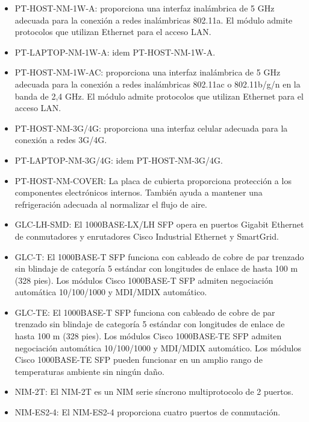 \documentclass{article}
\begin{document}
\begin{itemize}
    \item PT-HOST-NM-1W-A: proporciona una interfaz inalámbrica de 5 GHz adecuada para la conexión a redes inalámbricas 802.11a. El módulo admite protocolos que utilizan Ethernet para el acceso LAN.
    \item PT-LAPTOP-NM-1W-A: idem PT-HOST-NM-1W-A.
    
    \item PT-HOST-NM-1W-AC: proporciona una interfaz inalámbrica de 5 GHz adecuada para la conexión a redes inalámbricas 802.11ac o 802.11b/g/n en la banda de 2,4 GHz. El módulo admite protocolos que utilizan Ethernet para el acceso LAN.
    
    \item PT-HOST-NM-3G/4G: proporciona una interfaz celular adecuada para la conexión a redes 3G/4G.
    \item PT-LAPTOP-NM-3G/4G: idem PT-HOST-NM-3G/4G.

    \item PT-HOST-NM-COVER: La placa de cubierta proporciona protección a los componentes electrónicos internos. También ayuda a mantener una refrigeración adecuada al normalizar el flujo de aire.

    \item GLC-LH-SMD: El 1000BASE-LX/LH SFP opera en puertos Gigabit Ethernet de conmutadores y enrutadores Cisco Industrial Ethernet y SmartGrid.

    \item GLC-T: El 1000BASE-T SFP funciona con cableado de cobre de par trenzado sin blindaje de categoría 5 estándar con longitudes de enlace de hasta 100 m (328 pies). Los módulos Cisco 1000BASE-T SFP admiten negociación automática 10/100/1000 y MDI/MDIX automático.

    \item GLC-TE: El 1000BASE-T SFP funciona con cableado de cobre de par trenzado sin blindaje de categoría 5 estándar con longitudes de enlace de hasta 100 m (328 pies). Los módulos Cisco 1000BASE-TE SFP admiten negociación automática 10/100/1000 y MDI/MDIX automático. Los módulos Cisco 1000BASE-TE SFP pueden funcionar en un amplio rango de temperaturas ambiente sin ningún daño.

    \item NIM-2T: El NIM-2T es un NIM serie síncrono multiprotocolo de 2 puertos.

    \item NIM-ES2-4: El NIM-ES2-4 proporciona cuatro puertos de conmutación.


\end{itemize}
\end{document}
